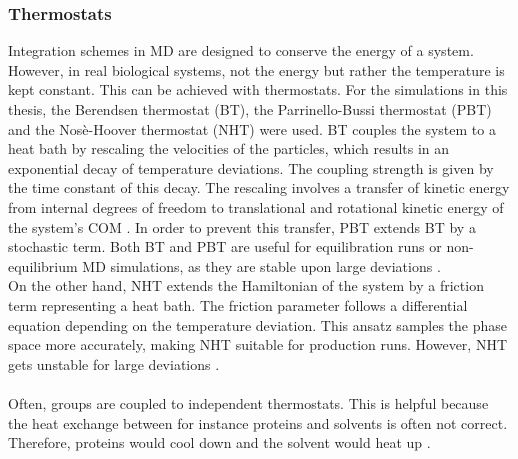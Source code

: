 \subsubsection{Thermostats}
Integration schemes in MD are designed to conserve the energy of a system. However, in real biological systems, not the energy but rather the temperature is kept constant. This can be achieved with thermostats. For the simulations in this thesis, the Berendsen thermostat \autocite{berendsen} (BT), the Parrinello-Bussi thermostat \autocite{parinelloBussi} (PBT) and the Nosè-Hoover thermostat \autocites{nosehooverthermo}{nosehooverthermo2} (NHT) were used. BT couples the system to a heat bath by rescaling the velocities of the particles, which results in an exponential decay of temperature deviations. The coupling strength is given by the time constant of this decay. The rescaling involves a transfer of kinetic energy from internal degrees of freedom to translational and rotational kinetic energy of the system's COM \autocite{velRescaleSucks}. In order to prevent this transfer, PBT extends BT by a stochastic term. Both BT and PBT are useful for equilibration runs or non-equilibrium MD simulations, as they are stable upon large deviations \autocites{berendsen}[p. 31]{gromacsManual}.\\
On the other hand, NHT extends the Hamiltonian of the system by a friction term representing a heat bath. The friction parameter follows a differential equation depending on the temperature deviation. This ansatz samples the phase space more accurately, making NHT suitable for production runs. However, NHT gets unstable for large deviations \autocite[p. 32-33]{gromacsManual}.\\
\\
Often, groups are coupled to independent thermostats. This is helpful because the heat exchange between for instance proteins and solvents is often not correct. Therefore, proteins would cool down and the solvent would heat up \autocite[p. 34]{gromacsManual}.
